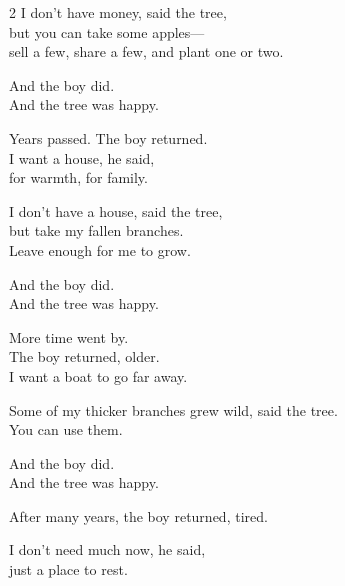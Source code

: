 \begin{center}
\begin{minipage}{0.85\textwidth}
\begin{multicols}{2}
{\large \QENOpen{}I don't have money,\QENClose{} said the tree,\\
\QENOpen{}but you can take some apples—\\
sell a few, share a few, and plant one or two.\QENClose{}}

\vspace{0.5em}

{\large And the boy did.\\
And the tree was happy.}

\vspace{0.5em}

\columnbreak

{\large Years passed. The boy returned.\\
\QENOpen{}I want a house,\QENClose{} he said,\\
\QENOpen{}for warmth, for family.\QENClose{}}

\vspace{0.5em}

{\large \QENOpen{}I don't have a house,\QENClose{} said the tree,\\
\QENOpen{}but take my fallen branches.\\
Leave enough for me to grow.\QENClose{}}

\vspace{0.5em}

{\large And the boy did.\\
And the tree was happy.}

\vspace{0.5em}

{\large More time went by.\\
The boy returned, older.\\
\QENOpen{}I want a boat to go far away.\QENClose{}}

\vspace{0.5em}

{\large \QENOpen{}Some of my thicker branches grew wild,\QENClose{} said the tree.\\
\QENOpen{}You can use them.\QENClose{}}

\vspace{0.5em}
{\large And the boy did.\\
And the tree was happy.}

{\large After many years, the boy returned, tired.\\
\vspace{0.5em}

\QENOpen{}I don't need much now,\QENClose{} he said,\\
\QENOpen{}just a place to rest.\QENClose{}}


\end{multicols}
\end{minipage}
\end{center}
